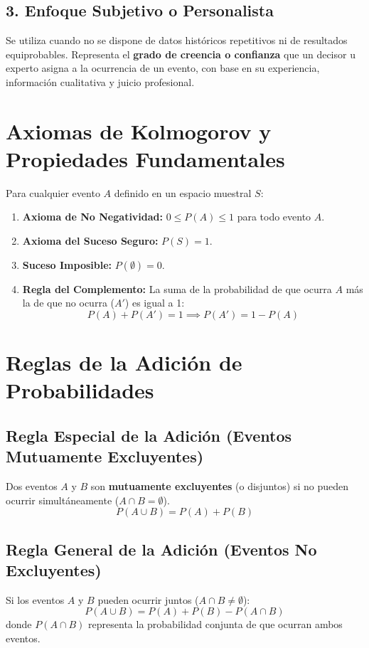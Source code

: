 \subsection{3. Enfoque Subjetivo o Personalista}
Se utiliza cuando no se dispone de datos históricos repetitivos ni de resultados equiprobables. Representa el \textbf{grado de creencia o confianza} que un decisor u experto asigna a la ocurrencia de un evento, con base en su experiencia, información cualitativa y juicio profesional.

\section{Axiomas de Kolmogorov y Propiedades Fundamentales}
Para cualquier evento $A$ definido en un espacio muestral $S$:
\begin{enumerate}
    \item \textbf{Axioma de No Negatividad:} $0 \le P(A) \le 1$ para todo evento $A$.
    \item \textbf{Axioma del Suceso Seguro:} $P(S) = 1$.
    \item \textbf{Suceso Imposible:} $P(\emptyset) = 0$.
    \item \textbf{Regla del Complemento:} La suma de la probabilidad de que ocurra $A$ más la de que no ocurra ($A'$) es igual a 1:
    \begin{equation}
        P(A) + P(A') = 1 \implies P(A') = 1 - P(A)
    \end{equation}
\end{enumerate}

\section{Reglas de la Adición de Probabilidades}

\subsection{Regla Especial de la Adición (Eventos Mutuamente Excluyentes)}
Dos eventos $A$ y $B$ son \textbf{mutuamente excluyentes} (o disjuntos) si no pueden ocurrir simultáneamente ($A \cap B = \emptyset$).
\begin{equation}
    P(A \cup B) = P(A) + P(B)
\end{equation}

\subsection{Regla General de la Adición (Eventos No Excluyentes)}
Si los eventos $A$ y $B$ pueden ocurrir juntos ($A \cap B \neq \emptyset$):
\begin{equation}
    P(A \cup B) = P(A) + P(B) - P(A \cap B)
\end{equation}
donde $P(A \cap B)$ representa la probabilidad conjunta de que ocurran ambos eventos.


